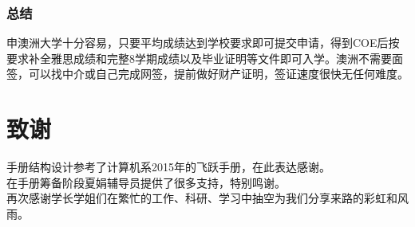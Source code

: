 \documentclass[a4paper,UTF8]{book}
\begin{document}
    \subsection*{总结}
    申澳洲大学十分容易，只要平均成绩达到学校要求即可提交申请，得到COE后按要求补全雅思成绩和完整8学期成绩以及毕业证明等文件即可入学。澳洲不需要面签，可以找中介或自己完成网签，提前做好财产证明，签证速度很快无任何难度。
    

\chapter{致谢}

手册结构设计参考了计算机系2015年的飞跃手册，在此表达感谢。\\

在手册筹备阶段夏娟辅导员提供了很多支持，特别鸣谢。\\

再次感谢学长学姐们在繁忙的工作、科研、学习中抽空为我们分享来路的彩虹和风雨。
\end{document}
